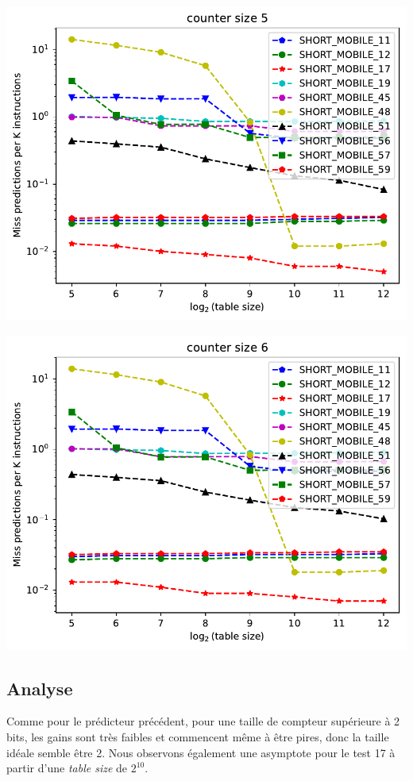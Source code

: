 \documentclass[a4paper]{article}
\begin{document}
\begin{minipage}{.48\linewidth}
\includegraphics[width=\linewidth]{gshare/graph_5}
\end{minipage}%
\hfill
\begin{minipage}{.48\linewidth}
\includegraphics[width=\linewidth]{gshare/graph_6}
\end{minipage}

\subsection{Analyse}
Comme pour le prédicteur précédent, pour une taille de compteur supérieure à 2 bits, les gains sont très faibles et commencent même à être pires, donc la taille idéale semble être 2. Nous observons également une asymptote pour le test 17 à partir d'une \textit{table size} de $2^{10}$.
\end{document}
